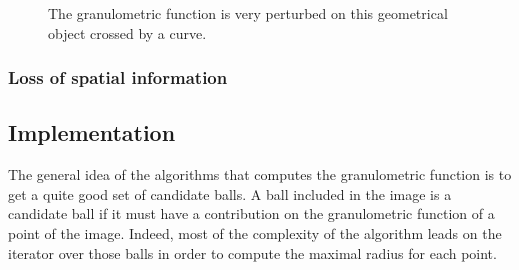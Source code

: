 \begin{figure}[!ht]
    \centering
    \qquad\qquad\qquad
    \caption{The granulometric function is very perturbed on this geometrical object crossed by a curve.}
	\label{device9-6}
\end{figure}

\subsubsection{Loss of spatial information}



\subsection{Implementation}

The general idea of the algorithms that computes the granulometric function is to get a quite good set of candidate balls. A ball included in the image is a candidate ball if it must have a contribution on the granulometric function of a point of the image. Indeed, most of the complexity of the algorithm leads on the iterator over those balls in order to compute the maximal radius for each point. 

